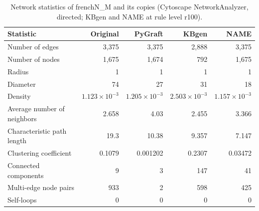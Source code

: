 \begin{table}[t]
\centering
\caption{Network statistics of frenchN\_M and its copies (Cytoscape NetworkAnalyzer, directed; KBgen and NAME at rule level r100).}
\label{tab:cytoscape_frenchN_M}
\begin{tabular}{lrrrr}
\toprule
Statistic & Original & PyGraft & KBgen & NAME \\
\midrule
Number of edges & 3{,}375 & 3{,}375 & 2{,}888 & 3{,}375 \\
Number of nodes & 1{,}675 & 1{,}674 & 792 & 1{,}675 \\
Radius & 1 & 1 & 1 & 1 \\
Diameter & 74 & 27 & 31 & 18 \\
Density & $1.123\times10^{-3}$ & $1.205\times10^{-3}$ & $2.503\times10^{-3}$ & $1.157\times10^{-3}$ \\
Average number of neighbors & 2.658 & 4.03 & 2.455 & 3.366 \\
Characteristic path length & 19.3 & 10.38 & 9.357 & 7.147 \\
Clustering coefficient & 0.1079 & 0.001202 & 0.2307 & 0.03472 \\
Connected components & 9 & 3 & 147 & 41 \\
Multi-edge node pairs & 933 & 2 & 598 & 425 \\
Self-loops & 0 & 0 & 0 & 0 \\
\bottomrule
\end{tabular}
\end{table}
